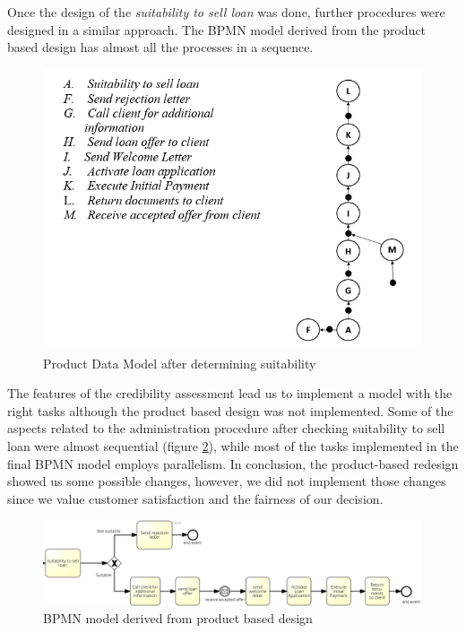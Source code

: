 \documentclass[a4paper]{article} %
\begin{document}
Once the design of the \textit{suitability to sell loan} was done, further procedures were designed in a similar approach. The BPMN model derived from the product based design has almost all the processes in a sequence.\\

\begin{figure}[H]
\centering
\includegraphics[scale=0.8, frame]{PDM2}
\caption{Product Data Model after determining suitability}
\label{PDM2}
\end{figure}
The features of the credibility assessment lead us to implement a model with the right tasks although the product based design was not implemented. Some of the aspects related to the administration procedure after checking suitability to sell loan were almost sequential (figure \ref{BPM2}), while most of the tasks implemented in the final BPMN model employs parallelism. In conclusion, the product-based redesign showed us some possible changes, however, we did not implement those changes since we value customer satisfaction and the fairness of our decision. \\

\begin{figure}[H]
\centering
\includegraphics[scale=0.5]{BPM2}
\caption{BPMN model derived from product based design}
\label{BPM2}
\end{figure}
\end{document}
